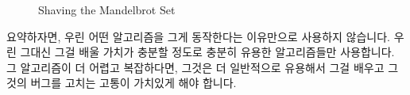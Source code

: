 \begin{figure}[tbp]
\centering
{}
\caption{Shaving the Mandelbrot Set}
\end{figure}

요약하자면, 우린 어떤 알고리즘을 그게 동작한다는 이유만으로 사용하지 않습니다.
우린 그대신 그걸 배울 가치가 충분할 정도로 충분히 유용한 알고리즘들만
사용합니다.
그 알고리즘이 더 어렵고 복잡하다면, 그것은 더 일반적으로 유용해서 그걸 배우고
그것의 버그를 고치는 고통이 가치있게 해야 합니다.

